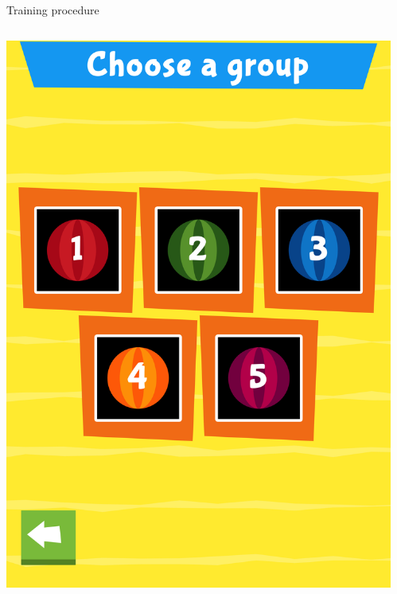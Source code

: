 \documentclass[final,xcolor={cmyk,hyperref}]{beamer}
\begin{document}
\begin{frame}[t]
\begin{columns}[t]
\begin{column}{0.45\linewidth}
\begin{block}{Training procedure}
\begin{columns}
\begin{column}{\screenshotwidth}
    \includegraphics[width=\linewidth]{images/CALVin-screenshots/jpgs/choose_group}
  \end{column}
  \begin{column}{\screenshotwidth}

\end{column}
\end{columns}
\end{block}
\end{column}
\end{columns}
\end{frame}
\end{document}
